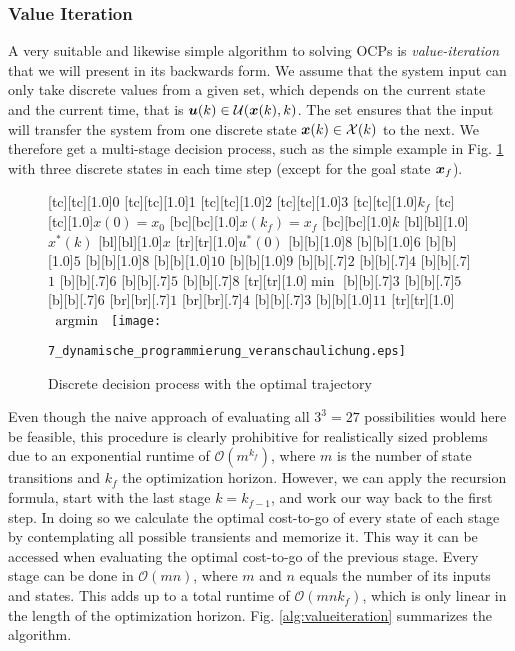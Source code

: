 \subsubsection{Value Iteration}\label{57.3.3.2}


A very suitable and likewise simple algorithm to solving OCPs is \emph{value-iteration} that we will present in its backwards form. 
We assume that the system input can only take discrete values from a given set, which depends on the current state and the current time, that is $\boldsymbol{u}(k) \in \mathcal U(\boldsymbol{x}(k),k)$. 
The set ensures that the input will transfer the system from one discrete state $\boldsymbol{x}(k) \in \mathcal X(k)$ to the next. We therefore get a multi-stage decision process, such as the simple example in  Fig. \ref{fig:dynamische_programmierung_veranschaulichung} with three discrete states in each time step (except for the goal state $\boldsymbol{x}_f$). 

\begin{figure}[h]
	[tc][tc][1.0]{0}
	[tc][tc][1.0]{1}
	[tc][tc][1.0]{2}
	[tc][tc][1.0]{3}
	[tc][tc][1.0]{$k_f$}
	[tc][tc][1.0]{$x(0) = x_0$}
	[bc][bc][1.0]{$x(k_f) = x_f$}
	[bc][bc][1.0]{$k$}
	[bl][bl][1.0]{$x^\ast(k)$}
	[bl][bl][1.0]{$x$}
	[tr][tr][1.0]{$u^\ast(0)$}
	[b][1.0]{$8$}
	[b][1.0]{$6$}
	[b][1.0]{$5$}
	[b][1.0]{$8$}
	[b][1.0]{$10$}
	[b][1.0]{$9$}
	[b][.7]{$2$}
	[b][.7]{$4$}
	[b][.7]{$1$}
	[b][.7]{$6$}
	[b][.7]{$5$}
	[b][.7]{$8$}
	[tr][tr][1.0]{$\min$}
	[b][.7]{$3$}
	[b][.7]{$5$}
	[b][.7]{$6$}
	[br][br][.7]{$1$}
	[br][br][.7]{$4$}
	[b][.7]{$3$}
	[b][1.0]{$11$}
	[tr][tr][1.0]{$\argmin{}$}
	\centering
  	\texttt{[image: 7\_dynamische\_programmierung\_veranschaulichung.eps]}
	\caption[Discrete decision process]{Discrete decision process with the optimal trajectory}
	\label{fig:dynamische_programmierung_veranschaulichung}
\end{figure} 

Even though the naive approach of evaluating all $3^3 = 27$ possibilities would here be feasible, this procedure is clearly prohibitive for realistically sized problems due to an exponential runtime of $\mathcal O(m^{k_f})$, where $m$ is the number of state transitions and $k_f$ the optimization horizon. 
However, we can apply the recursion formula, start with the last stage $k=k_{f-1}$, and work our way back to the first step. 
In doing so we calculate the optimal cost-to-go of every state of each stage by contemplating all possible transients and memorize it. 
This way it can be accessed when evaluating the optimal cost-to-go of the previous stage. Every stage can be done in $\mathcal O(m n)$, where $m$ and $n$ equals the number of its inputs and states. 
This adds up to a total runtime of $\mathcal O(m n k_f)$, which is only linear in the length of the optimization horizon. Fig. \ref{alg:valueiteration} summarizes the algorithm.

